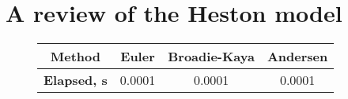 \chapter{A review of the Heston model}
    \begin{figure}[htbp]
        \begin{tabular}{|c|c|c|c|}\hline
            \textbf {Method} & \textbf {Euler} & \textbf {Broadie-Kaya} & \textbf {Andersen}\\
            \hline
            \textbf {Elapsed, s} & 0.0001 & 0.0001 & 0.0001\\
            \hline
        \end{tabular}
    \end{figure}